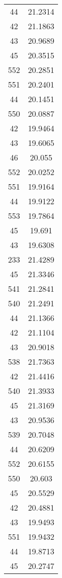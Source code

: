 \begin{tabular}[c]{|c|c|}
        44&   21.2314\\
        42&   21.1863\\
        43&   20.9689\\
        45&   20.3515\\
       552&   20.2851\\
       551&   20.2401\\
        44&   20.1451\\
       550&   20.0887\\
        42&   19.9464\\
        43&   19.6065\\
        46&    20.055\\
       552&   20.0252\\
       551&   19.9164\\
        44&   19.9122\\
       553&   19.7864\\
        45&    19.691\\
        43&   19.6308\\
       233&   21.4289\\
        45&   21.3346\\
       541&   21.2841\\
       540&   21.2491\\
        44&   21.1366\\
        42&   21.1104\\
        43&   20.9018\\
       538&   21.7363\\
        42&   21.4416\\
       540&   21.3933\\
        45&   21.3169\\
        43&   20.9536\\
       539&   20.7048\\
        44&   20.6209\\
       552&   20.6155\\
       550&    20.603\\
        45&   20.5529\\
        42&   20.4881\\
        43&   19.9493\\
       551&   19.9432\\
        44&   19.8713\\
        45&   20.2747\\

\end{tabular}
